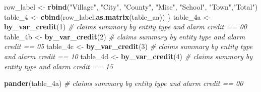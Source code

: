 \documentclass[]{book}
\newenvironment{Shaded}{\begin{snugshade}}{\end{snugshade}}
\newcommand{\KeywordTok}[1]{\textcolor[rgb]{0.13,0.29,0.53}{\textbf{#1}}}
\newcommand{\DecValTok}[1]{\textcolor[rgb]{0.00,0.00,0.81}{#1}}
\newcommand{\StringTok}[1]{\textcolor[rgb]{0.31,0.60,0.02}{#1}}
\newcommand{\CommentTok}[1]{\textcolor[rgb]{0.56,0.35,0.01}{\textit{#1}}}
\newcommand{\NormalTok}[1]{#1}
\theoremstyle{definition}
\theoremstyle{definition}
\theoremstyle{definition}
\theoremstyle{remark}
\begin{document}
\begin{Shaded}
\begin{Highlighting}[]
\NormalTok{row_label <-}\StringTok{ }\KeywordTok{rbind}\NormalTok{(}\StringTok{"Village"}\NormalTok{, }\StringTok{"City"}\NormalTok{, }\StringTok{"County"}\NormalTok{, }\StringTok{"Misc"}\NormalTok{, }\StringTok{"School"}\NormalTok{, }\StringTok{"Town"}\NormalTok{,}\StringTok{"Total"}\NormalTok{)}
\NormalTok{table_}\DecValTok{4}\NormalTok{ <-}\StringTok{ }\KeywordTok{cbind}\NormalTok{(row_label,}\KeywordTok{as.matrix}\NormalTok{(table_aa))}
\NormalTok{\}}
\NormalTok{table_4a <-}\StringTok{ }\KeywordTok{by_var_credit}\NormalTok{(}\DecValTok{1}\NormalTok{)  }\CommentTok{# claims summary by entity type and alarm credit == 00}
\NormalTok{table_4b <-}\StringTok{ }\KeywordTok{by_var_credit}\NormalTok{(}\DecValTok{2}\NormalTok{)  }\CommentTok{# claims summary by entity type and alarm credit == 05 }
\NormalTok{table_4c <-}\StringTok{ }\KeywordTok{by_var_credit}\NormalTok{(}\DecValTok{3}\NormalTok{)  }\CommentTok{# claims summary by entity type and alarm credit == 10}
\NormalTok{table_4d <-}\StringTok{ }\KeywordTok{by_var_credit}\NormalTok{(}\DecValTok{4}\NormalTok{)  }\CommentTok{# claims summary by entity type and alarm credit == 15}
\end{Highlighting}
\end{Shaded}

\begin{Shaded}
\begin{Highlighting}[]
\KeywordTok{pander}\NormalTok{(table_4a)  }\CommentTok{# claims summary by entity type and alarm credit == 00}
\end{Highlighting}
\end{Shaded}
\end{document}

